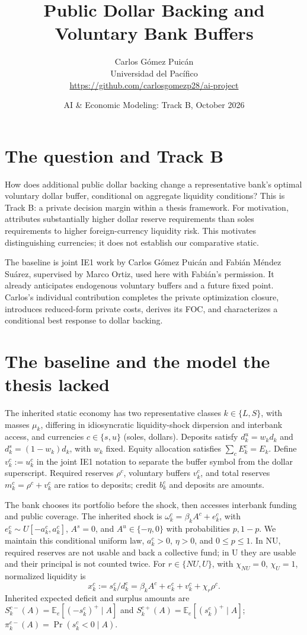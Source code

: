 \documentclass[11pt]{article}
\title{Public Dollar Backing and Voluntary Bank Buffers}
\author{Carlos G\'omez Puic\'an\\
\small Universidad del Pac\'ifico\\
\small\url{https://github.com/carlosgomezp28/ai-project}}
\date{AI \& Economic Modeling: Track B, October 2026}
\begin{document}
\maketitle

\section{The question and Track B}
How does additional public dollar backing change a representative bank's optimal voluntary dollar buffer, conditional on aggregate liquidity conditions? This is Track B: a private decision margin within a thesis framework. For motivation, \citet[Box~7]{bcrp2024} attributes substantially higher dollar reserve requirements than soles requirements to higher foreign-currency liquidity risk. This motivates distinguishing currencies; it does not establish our comparative static.

The baseline is joint IE1 work by Carlos G\'omez Puic\'an and Fabi\'an M\'endez Su\'arez, supervised by Marco Ortiz, used here with Fabi\'an's permission. It already anticipates endogenous voluntary buffers and a future fixed point. Carlos's individual contribution completes the private optimization closure, introduces reduced-form private costs, derives its FOC, and characterizes a conditional best response to dollar backing.

\section{The baseline and the model the thesis lacked}
The inherited static economy has two representative classes $k\in\{L,S\}$, with masses $\mu_k$, differing in idiosyncratic liquidity-shock dispersion and interbank access, and currencies $c\in\{s,u\}$ (soles, dollars). Deposits satisfy $d_k^u=w_kd_k$ and $d_k^s=(1-w_k)d_k$, with $w_k$ fixed. Equity allocation satisfies $\sum_cE_k^c=E_k$. Define $v_k^c:=u_k^c$ in the joint IE1 notation to separate the buffer symbol from the dollar superscript. Required reserves $\rho^c$, voluntary buffers $v_k^c$, and total reserves $m_k^c=\rho^c+v_k^c$ are ratios to deposits; credit $b_k^c$ and deposits are amounts.

The bank chooses its portfolio before the shock, then accesses interbank funding and public coverage. The inherited shock is $\omega_k^c=\beta_kA^c+e_k^c$, with $e_k^c\sim U[-a_k^c,a_k^c]$, $A^s=0$, and $A^u\in\{-\eta,0\}$ with probabilities $p,1-p$. We maintain this conditional uniform law, $a_k^c>0$, $\eta>0$, and $0\le p\le1$. In NU, required reserves are not usable and back a collective fund; in U they are usable and their principal is not counted twice. For $r\in\{NU,U\}$, with $\chi_{NU}=0$, $\chi_U=1$, normalized liquidity is
\[
 x_k^c:=s_k^c/d_k^c=\beta_kA^c+e_k^c+v_k^c+\chi_r\rho^c.
\]
Inherited expected deficit and surplus amounts are $S_k^{c-}(A)=\mathbb E_e[(-s_k^c)^+\mid A]$ and $S_k^{c+}(A)=\mathbb E_e[(s_k^c)^+\mid A]$; $\pi_k^{c-}(A)=\Pr(s_k^c<0\mid A)$.
\end{document}
